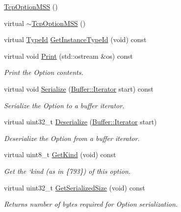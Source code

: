 \begin{DoxyCompactItemize}
\item 
\hyperlink{classns3_1_1TcpOptionMSS_a3e43e37e441f0d0586bbb619259ec6fb}{Tcp\+Option\+M\+SS} ()
\item 
virtual \hyperlink{classns3_1_1TcpOptionMSS_a693fe7dae9e9204deaab93dfb664b2e9}{$\sim$\+Tcp\+Option\+M\+SS} ()
\item 
virtual \hyperlink{classns3_1_1TypeId}{Type\+Id} \hyperlink{classns3_1_1TcpOptionMSS_a0b2239a28917a2f20db756ddf963a490}{Get\+Instance\+Type\+Id} (void) const 
\item 
virtual void \hyperlink{classns3_1_1TcpOptionMSS_a33f2f8523b9bcb7a25988a0f96c53b1c}{Print} (std\+::ostream \&os) const 
\begin{DoxyCompactList}\small\item\em Print the Option contents. \end{DoxyCompactList}\item 
virtual void \hyperlink{classns3_1_1TcpOptionMSS_a215e1d74349d02e8673da02c96a81f1e}{Serialize} (\hyperlink{classns3_1_1Buffer_1_1Iterator}{Buffer\+::\+Iterator} start) const 
\begin{DoxyCompactList}\small\item\em Serialize the Option to a buffer iterator. \end{DoxyCompactList}\item 
virtual uint32\+\_\+t \hyperlink{classns3_1_1TcpOptionMSS_aafc8691aa9a68e058098f956bbac1f39}{Deserialize} (\hyperlink{classns3_1_1Buffer_1_1Iterator}{Buffer\+::\+Iterator} start)
\begin{DoxyCompactList}\small\item\em Deserialize the Option from a buffer iterator. \end{DoxyCompactList}\item 
virtual uint8\+\_\+t \hyperlink{classns3_1_1TcpOptionMSS_a11d85ae0b7b14f25400cd97b158173d7}{Get\+Kind} (void) const 
\begin{DoxyCompactList}\small\item\em Get the `kind\textquotesingle{} (as in \{793\}) of this option. \end{DoxyCompactList}\item 
virtual uint32\+\_\+t \hyperlink{classns3_1_1TcpOptionMSS_a35cdbf284ed4eb34160543273034da5c}{Get\+Serialized\+Size} (void) const 
\begin{DoxyCompactList}\small\item\em Returns number of bytes required for Option serialization. \end{DoxyCompactList}\item 

\end{DoxyCompactItemize}
